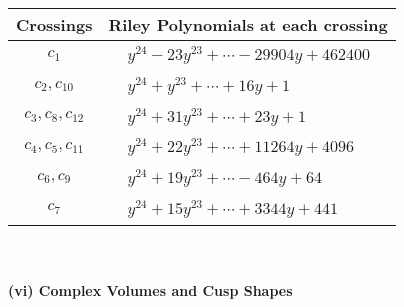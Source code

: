 \documentclass[1p]{elsarticle_modified}
\theoremstyle{definition}
\begin{document}
\begin{tabular}{m{50pt}|m{274pt}}
Crossings & \hspace{64pt}Riley Polynomials at each crossing \\
\hline $$\begin{aligned}c_{1}\end{aligned}$$&$\begin{aligned}
&y^{24}-23 y^{23}+\cdots-29904 y+462400
\end{aligned}$\\
\hline $$\begin{aligned}c_{2},c_{10}\end{aligned}$$&$\begin{aligned}
&y^{24}+y^{23}+\cdots+16 y+1
\end{aligned}$\\
\hline $$\begin{aligned}c_{3},c_{8},c_{12}\end{aligned}$$&$\begin{aligned}
&y^{24}+31 y^{23}+\cdots+23 y+1
\end{aligned}$\\
\hline $$\begin{aligned}c_{4},c_{5},c_{11}\end{aligned}$$&$\begin{aligned}
&y^{24}+22 y^{23}+\cdots+11264 y+4096
\end{aligned}$\\
\hline $$\begin{aligned}c_{6},c_{9}\end{aligned}$$&$\begin{aligned}
&y^{24}+19 y^{23}+\cdots-464 y+64
\end{aligned}$\\
\hline $$\begin{aligned}c_{7}\end{aligned}$$&$\begin{aligned}
&y^{24}+15 y^{23}+\cdots+3344 y+441
\end{aligned}$\\
\hline
\end{tabular}\\~\\
\newpage\flushleft \textbf{(vi) Complex Volumes and Cusp Shapes}
\end{document}
